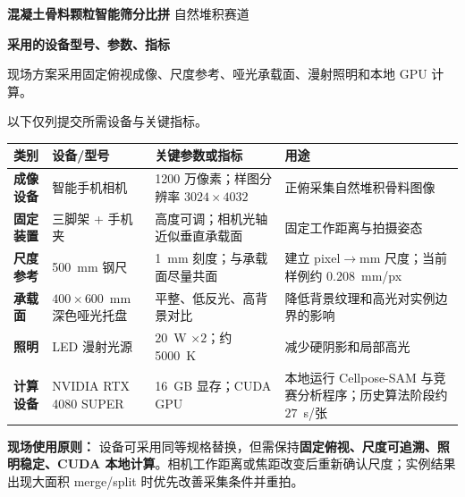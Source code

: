 \documentclass[UTF8,a4paper,11pt,fontset=fandol]{ctexart}
\begin{document}
{\bfseries 混凝土骨料颗粒智能筛分比拼}\hfill
{自然堆积赛道}

\vspace{0.35em}
{\bfseries 采用的设备型号、参数、指标}

\vspace{0.55em}
\textcolor{gray!80}{现场方案采用固定俯视成像、尺度参考、哑光承载面、漫射照明和本地 GPU 计算。}

\textcolor{gray!80}{以下仅列提交所需设备与关键指标。}

\vspace{1.0em}
\begin{tabularx}{\linewidth}{>{\bfseries}p{2.15cm} p{3.35cm} Y Y}
\toprule
类别 & 设备/型号 & 关键参数或指标 & 用途 \\
\midrule
成像设备 & 智能手机相机 & 1200 万像素；样图分辨率 $3024\times4032$ & 正俯采集自然堆积骨料图像 \\
固定装置 & 三脚架 + 手机夹 & 高度可调；相机光轴近似垂直承载面 & 固定工作距离与拍摄姿态 \\
尺度参考 & 500~mm 钢尺 & 1~mm 刻度；与承载面尽量共面 & 建立 pixel$\rightarrow$mm 尺度；当前样例约 $0.208$~mm/px \\
承载面 & $400\times600$~mm 深色哑光托盘 & 平整、低反光、高背景对比 & 降低背景纹理和高光对实例边界的影响 \\
照明 & LED 漫射光源 & $20$~W $\times 2$；约 5000~K & 减少硬阴影和局部高光 \\
计算设备 & NVIDIA RTX 4080 SUPER & 16~GB 显存；CUDA GPU & 本地运行 Cellpose-SAM 与竞赛分析程序；历史算法阶段约 $27$~s/张 \\
\bottomrule
\end{tabularx}

\vspace{1.0em}
\textbf{现场使用原则：}
设备可采用同等规格替换，但需保持\textbf{固定俯视、尺度可追溯、照明稳定、CUDA 本地计算}。相机工作距离或焦距改变后重新确认尺度；实例结果出现大面积 merge/split 时优先改善采集条件并重拍。

\vfill
\end{document}
